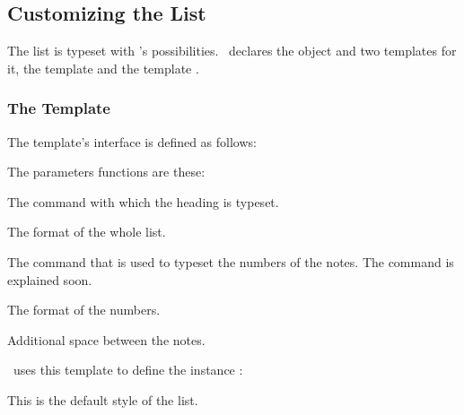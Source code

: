 \documentclass[load-preamble+]{cnltx-doc}
\begin{document}
\subsection{Customizing the List}\label{sec:customizing_the_list}
The list is typeset with 's possibilities.  \enotez\ declares
the object  and two templates for it, the template
 and the template .

\subsubsection{The  Template}
The  template's interface is defined as follows:
The parameters functions are these:
\begin{description}[style=nextline]
  \item[\code{heading}] The command with which the heading is typeset.
  \item[\code{format}] The format of the whole list.
  \item[\code{number}] The command that is used to typeset the numbers of the
    notes.  The command  is explained soon.
  \item[\code{numbers-format}] The format of the numbers.
  \item[\code{notes-sep}] Additional space between the notes.
\end{description}

\enotez\ uses this template to define the instance :
\begin{sourcecode}
\end{sourcecode}
This is the default style of the list.
\end{document}
